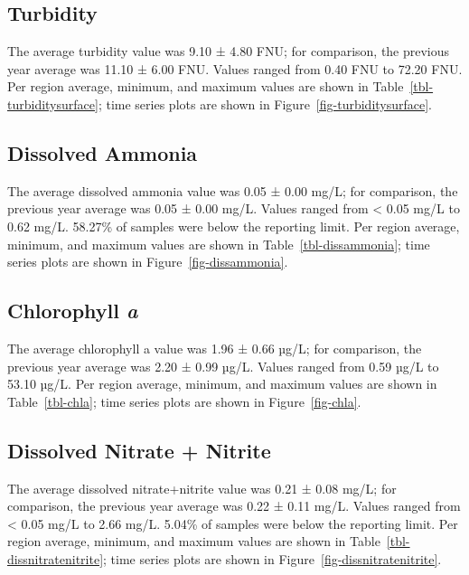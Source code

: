\documentclass[
  letterpaper,
]{article}
\begin{document}
\subsection{Turbidity}\label{turbidity}

The average turbidity value was 9.10 ± 4.80 FNU; for comparison, the
previous year average was 11.10 ± 6.00 FNU. Values ranged from 0.40 FNU
to 72.20 FNU. Per region average, minimum, and maximum values are shown
in Table~\ref{tbl-turbiditysurface}; time series plots are shown in
Figure~\ref{fig-turbiditysurface}.

\subsection{Dissolved Ammonia}\label{dissolved-ammonia}

The average dissolved ammonia value was 0.05 ± 0.00 mg/L; for
comparison, the previous year average was 0.05 ± 0.00 mg/L. Values
ranged from \textless{} 0.05 mg/L to 0.62 mg/L. 58.27\% of samples were
below the reporting limit. Per region average, minimum, and maximum
values are shown in Table~\ref{tbl-dissammonia}; time series plots are
shown in Figure~\ref{fig-dissammonia}.

\subsection{\texorpdfstring{Chlorophyll
\emph{a}}{Chlorophyll a}}\label{chlorophyll-a}

The average chlorophyll a value was 1.96 ± 0.66 µg/L; for comparison,
the previous year average was 2.20 ± 0.99 µg/L. Values ranged from 0.59
µg/L to 53.10 µg/L. Per region average, minimum, and maximum values are
shown in Table~\ref{tbl-chla}; time series plots are shown in
Figure~\ref{fig-chla}.

\subsection{Dissolved Nitrate +
Nitrite}\label{dissolved-nitrate-nitrite}

The average dissolved nitrate+nitrite value was 0.21 ± 0.08 mg/L; for
comparison, the previous year average was 0.22 ± 0.11 mg/L. Values
ranged from \textless{} 0.05 mg/L to 2.66 mg/L. 5.04\% of samples were
below the reporting limit. Per region average, minimum, and maximum
values are shown in Table~\ref{tbl-dissnitratenitrite}; time series
plots are shown in Figure~\ref{fig-dissnitratenitrite}.
\end{document}
